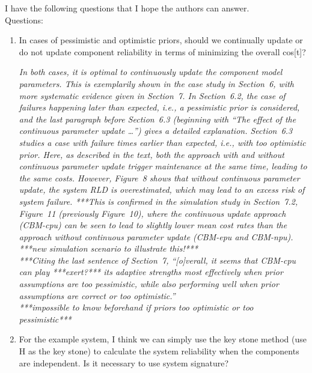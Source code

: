 \documentclass[authoryear]{elsarticle}
\begin{document}
I have the following questions that I hope the authors can answer.\\
Questions:
\begin{enumerate}
\item In cases of pessimistic and optimistic priors, should we continually update or do not update component reliability in terms of minimizing the overall cos[t]?

\smallskip

\emph{In both cases, it is optimal to continuously update the component model parameters.
This is exemplarily shown in the case study in Section~6, with more systematic evidence given in Section~7.
In Section~6.2, the case of failures happening later than expected, i.e., a pessimistic prior is considered,
and the last paragraph before Section~6.3 (beginning with ``The effect of the continuous parameter update \ldots'')
gives a detailed explanation.
Section~6.3 studies a case with failure times earlier than expected, i.e., with too optimistic prior.
Here, as described in the text, both the approach with and without continuous parameter update
trigger maintenance at the same time, leading to the same costs.
However, Figure~8 shows that without continuous parameter update, the system RLD is overestimated,
which may lead to an excess risk of system failure.
***This is confirmed in the simulation study in Section~7.2, Figure~11 (previously Figure~10),
where the continuous update approach (CBM-cpu) can be seen to lead to slightly lower mean cost rates
than the approach without continuous parameter update (CBM-epu and CBM-npu).\\
%
***new simulation scenario to illustrate this!***\\
%
***Citing the last sentence of Section~7,
``[o]verall, it seems that CBM-cpu can play ***exert?*** its adaptive strengths most effectively
when prior assumptions are too pessimistic,
while also performing well when prior assumptions are correct or too optimistic.''\\
%
***impossible to know beforehand if priors too optimistic or too pessimistic***}
%
\item For the example system, I think we can simply use the key stone method (use H as the key stone) to calculate the system reliability when the components are independent.  Is it necessary to use system signature? 

\smallskip


\end{enumerate}
\end{document}
